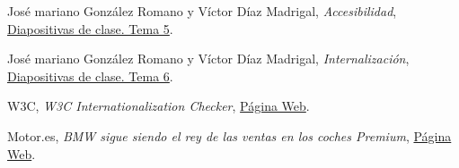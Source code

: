 \documentclass[a4paper,11pt]{article}
\begin{document}
\begin{thebibliography}{99}
José mariano González Romano y Víctor Díaz Madrigal,
\textit{Accesibilidad},
\href{https://s3-eu-central-1.amazonaws.com/learn-eu-central-1-prod-fleet01-xythos/5ac734ed505df/2113026?response-content-disposition=inline%3B%20filename%2A%3DUTF-8%27%27IPO-2018-19-05-Accesibilidad.pdf&response-content-type=application%2Fpdf&X-Amz-Algorithm=AWS4-HMAC-SHA256&X-Amz-Date=20181204T121814Z&X-Amz-SignedHeaders=host&X-Amz-Expires=21600&X-Amz-Credential=AKIAIZ3QX2YUHH4EOO3A%2F20181204%2Feu-central-1%2Fs3%2Faws4_request&X-Amz-Signature=c47e51bae64476cffa8186f4f4bb7c40257eac45d1f2a68b63e6b66dbc5a1609}{Diapositivas de clase. Tema 5}.

José mariano González Romano y Víctor Díaz Madrigal,
\textit{Internalización},
\href{https://s3-eu-central-1.amazonaws.com/learn-eu-central-1-prod-fleet01-xythos/5ac734ed505df/2214811?response-content-disposition=inline%3B%20filename%2A%3DUTF-8%27%27IPO-2018-19-06-Internacionalizaci%25C3%25B3n.pdf&response-content-type=application%2Fpdf&X-Amz-Algorithm=AWS4-HMAC-SHA256&X-Amz-Date=20181204T121848Z&X-Amz-SignedHeaders=host&X-Amz-Expires=21600&X-Amz-Credential=AKIAIZ3QX2YUHH4EOO3A%2F20181204%2Feu-central-1%2Fs3%2Faws4_request&X-Amz-Signature=e7b08ac13f1e9819a1a8f39938e1176631bfe0cf869f6b30b0e687b6a0efa442}{Diapositivas de clase. Tema 6}.

W3C,
\textit{W3C Internationalization Checker},
\href{http://validator.w3.org/i18n-checker/}{Página Web}.

Motor.es,
\textit{BMW sigue siendo el rey de las ventas en los coches Premium},
\href{https://www.motor.es/noticias/bmw-sigue-siendo-el-rey-de-las-ventas-en-los-coches-premium.php}{Página Web}.


\end{thebibliography}
\end{document}
